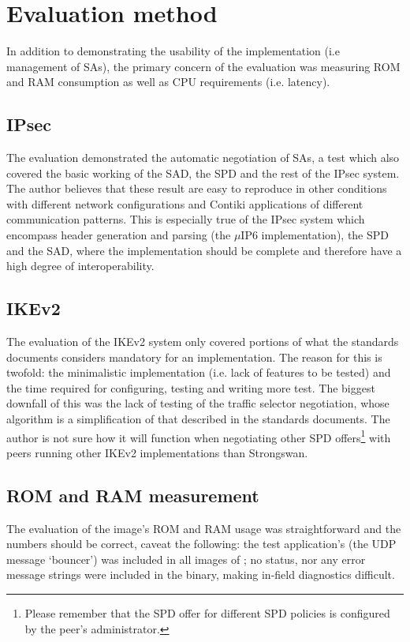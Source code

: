 \documentclass[final,a4paper,twoside,11pt,onecolumn]{report}
\begin{document}
\section{Evaluation method}
In addition to demonstrating the usability of the implementation (i.e management of SAs), the primary concern of the evaluation was measuring ROM and RAM consumption as well as CPU requirements (i.e. latency).

\subsection{IPsec}
The evaluation demonstrated the automatic negotiation of SAs, a test which also covered the basic working of the SAD, the SPD and the rest of the IPsec system. The author believes that these result are easy to reproduce in other conditions with different network configurations and Contiki applications of different communication patterns. This is especially true of the IPsec system which encompass header generation and parsing (the $\mu$IP6 implementation), the SPD and the SAD, where the implementation should be complete and therefore have a high degree of interoperability.

\subsection{IKEv2}
The evaluation of the IKEv2 system only covered portions of what the standards documents considers mandatory for an implementation. The reason for this is twofold: the minimalistic implementation (i.e. lack of features to be tested) and the time required for configuring, testing and writing more test. The biggest downfall of this was the lack of testing of the traffic selector negotiation, whose algorithm is a simplification of that described in the standards documents. The author is not sure how it will function when negotiating other SPD offers\footnote{Please remember that the SPD offer for different SPD policies is configured by the peer's administrator.} with peers running other IKEv2 implementations than Strongswan.

\subsection{ROM and RAM measurement}
The evaluation of the image's ROM and RAM usage was straightforward and the numbers should be correct, caveat the following: the test application's (the UDP message `bouncer') was included in all images of ; no status, nor any error message strings were included in the binary, making in-field diagnostics difficult.
\end{document}
